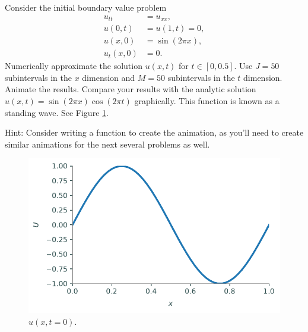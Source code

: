 \begin{problem}
\label{prob:prob2}
Consider the initial boundary value problem
\begin{align*}
	u_{tt} &= u_{xx}, \\
	u(0,t) &= u(1,t) = 0, \\
	u(x,0) &= \sin(2 \pi x),\\
	u_t(x,0) &= 0.
\end{align*}
Numerically approximate the solution $u(x,t)$ for $t \in \left[0,0.5\right]$.
Use $J=50$ subintervals in the $x$ dimension and $M=50$ subintervals in the $t$ dimension.
Animate the results.
Compare your results with the analytic solution $u(x,t) = \sin{(2 \pi x)} \cos{(2 \pi t)}$ graphically.
This function is known as a standing wave.
See Figure \ref{fig:prob2}.

Hint: Consider writing a function to create the animation, as you'll need to create similar animations for the next several problems as well.

\begin{figure}[H]
\centering
\includegraphics[width=\textwidth]{figures/prob2.pdf}
\caption{$u(x,t=0)$.}
\label{fig:prob2}
\end{figure}
\end{problem}

